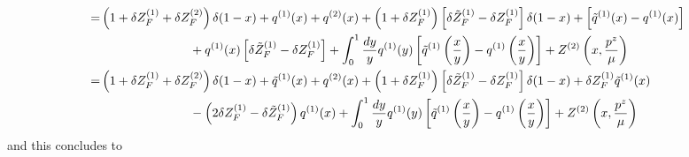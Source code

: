 \documentclass{article}
\DeclarePairedDelimiter\BraceM\{\}
\let\Bqty\relax
\newcommand{\Bqty}[1]{\BraceM*{#1}}
\begin{document}
\begin{align}
	= & \left(1+\delta Z_{F}^{(1)}+\delta Z_{F}^{(2)}\right) \delta(1-x)+q^{(1)}(x)+q^{(2)}(x)
	+\left(1+\delta Z_{F}^{(1)}\right)\Bqty{\left[\delta \tilde{Z}_{F}^{(1)}-\delta Z_{F}^{(1)}\right] \delta(1-x)+\left[\tilde{q}^{(1)}(x)-q^{(1)}(x)\right]}\notag\\&\hspace*{1in}
	+q^{(1)}(x)\left[\delta \tilde{Z}_{F}^{(1)}-\delta Z_{F}^{(1)}\right]+\int_{0}^{1} \frac{d y}{y}q^{(1)}(y)\left[\tilde{q}^{(1)}\left(\frac{x}{y}\right)-q^{(1)}\left(\frac{x}{y}\right)\right]
	+Z^{(2)}\left(x, \frac{p^{z}}{\mu}\right)\notag\\
	= & \left(1+\delta Z_{F}^{(1)}+\delta Z_{F}^{(2)}\right) \delta(1-x)+\tilde{q}^{(1)}(x)+q^{(2)}(x)
	+\left(1+\delta Z_{F}^{(1)}\right)\left[\delta \tilde{Z}_{F}^{(1)}-\delta Z_{F}^{(1)}\right] \delta(1-x)+\delta Z_{F}^{(1)}\tilde{q}^{(1)}(x)\notag\\&\hspace*{1in}
	-\left(2\delta Z_{F}^{(1)}-\delta \tilde{Z}_{F}^{(1)}\right)q^{(1)}(x)+\int_{0}^{1} \frac{d y}{y}q^{(1)}(y)\left[\tilde{q}^{(1)}\left(\frac{x}{y}\right)-q^{(1)}\left(\frac{x}{y}\right)\right]
	+Z^{(2)}\left(x, \frac{p^{z}}{\mu}\right)
\end{align}
and this concludes to
\end{document}
